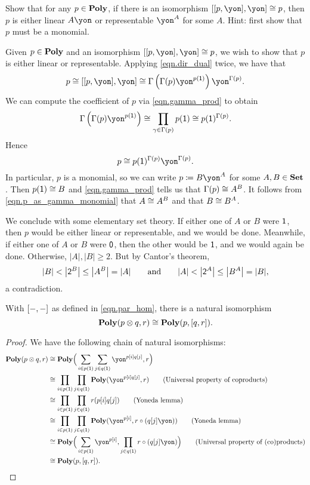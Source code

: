 \documentclass[Book-Poly]{subfiles}
\begin{document}
\begin{exercise}
Show that for any $p\in\mathbf{Poly}$, if there is an isomorphism $\ihom{\ihom{p,\yon},\yon} \iso p$, then $p$ is either linear $A\yon$ or representable $\yon^A$ for some $A$. Hint: first show that $p$ must be a monomial.
\begin{solution}
Given $p \in \mathbf{Poly}$ and an isomorphism $\ihom{\ihom{p,\yon},\yon} \iso p$, we wish to show that $p$ is either linear or representable.
Applying \eqref{eqn.dir_dual} twice, we have that
\[
    p \iso \ihom{\ihom{p,\yon},\yon} \iso \Gamma\left(\Gamma(p)\yon^{p(\1)}\right)\yon^{\Gamma(p)}.
\]
We can compute the coefficient of $p$ via \eqref{eqn.gamma_prod} to obtain
\[
    \Gamma\left(\Gamma(p)\yon^{p(\1)}\right) \iso \prod_{\gamma \in \Gamma(p)} p(\1) \iso p(\1)^{\Gamma(p)}.
\]
Hence
\begin{equation} \label{eqn.p_as_gamma_monomial}
    p \iso p(\1)^{\Gamma(p)}\yon^{\Gamma(p)}.
\end{equation}
In particular, $p$ is a monomial, so we can write $p \coloneqq B\yon^A$ for some $A,B \in \mathbf{Set}$.
Then $p(\textsf{1}) \cong B$ and \eqref{eqn.gamma_prod} tells us that $\Gamma(p) \cong A^B$.
It follows from \eqref{eqn.p_as_gamma_monomial} that $A \cong A^B$ and that $B \cong B^A$.

We conclude with some elementary set theory.
If either one of $A$ or $B$ were $\textsf{1}$, then $p$ would be either linear or representable, and we would be done.
Meanwhile, if either one of $A$ or $B$ were $\textsf{0}$, then the other would be $\textsf{1}$, and we would again be done.
Otherwise, $|A|,|B| \geq 2$.
But by Cantor's theorem,
\[
    |B| < \big|\textsf{2}^B\big| \leq \big|A^B\big| = |A| \qquad\text{and}\qquad |A| < \big|\textsf{2}^A\big| \leq \big|B^A\big| = |B|,
\]
a contradiction.
\end{solution}
\end{exercise}

\begin{proposition}\label{prop.parallel_closure}
With $[-,-]$ as defined in \eqref{eqn.par_hom}, there is a natural isomorphism
\begin{equation}\label{eqn.poly_closure_brackets}
	\mathbf{Poly}(p\otimes q,r)\cong\mathbf{Poly}(p,[q,r]).
\end{equation}
\end{proposition}
\begin{proof}
We have the following chain of natural isomorphisms:
\begin{align*}
	\poly(p\otimes q,r)
	&\iso
	\poly\Big(\sum_{i\in p(\1)}\sum_{j\in q(\1)}\yon^{p[i]q[j]},r\Big) \\
	&\iso
	\prod_{i\in p(\1)}\prod_{j\in q(\1)}\poly(\yon^{p[i]q[j]},r)
	\tag{Universal property of coproducts} \\
	&\iso
	\prod_{i\in p(\1)}\prod_{j\in q(\1)}r(p[i]q[j])
	\tag{Yoneda lemma} \\
	&\iso
	\prod_{i\in p(\1)}\prod_{j\in q(\1)}\poly(\yon^{p[i]},r\circ(q[j]\yon))
	\tag{Yoneda lemma} \\
	&\iso
	\poly\Big(\sum_{i\in p(\1)}\yon^{p[i]},\prod_{j\in q(\1)}r\circ(q[j]\yon)\Big)
	\tag{Universal property of (co)products} \\
	&\iso
	\poly(p,\ihom{q,r}).
\end{align*}
\end{proof}
\end{document}
